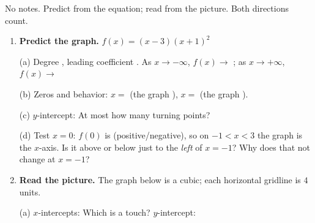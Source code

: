 \documentclass[10pt]{article}
\newcommand{\lgrid}[4]{%
  \draw[step=1, linegray!40, very thin] (#1,#3) grid (#2,#4);
  \draw[->, semithick, charcoal] (#1,0)--(#2,0) node[below right, font=\scriptsize]{$x$};
  \draw[->, semithick, charcoal] (0,#3)--(0,#4) node[left, font=\scriptsize]{$y$};}
\begin{document}
\namedateperiod

\vspace{0.08in}

No notes. Predict from the equation; read from the picture. Both directions count.

\begin{enumerate}[leftmargin=1.8em, itemsep=10pt]
  \item \textbf{Predict the graph.} $f(x) = (x-3)(x+1)^2$

    \vspace{3pt}
    (a) Degree \blank{0.8cm}, leading coefficient \blank{0.8cm}. \; As $x \to -\infty$, $f(x) \to$
    \blank{1.2cm}; as $x \to +\infty$, $f(x) \to$ \blank{1.2cm}

    \vspace{3pt}
    (b) Zeros and behavior: $x = $ \blank{1.0cm} (the graph \blank{1.8cm}), \quad
    $x = $ \blank{1.0cm} (the graph \blank{1.8cm}).

    \vspace{3pt}
    (c) $y$-intercept: \blank{1.6cm} \qquad At most how many turning points? \blank{1.0cm}

    \vspace{3pt}
    (d) Test $x=0$: $f(0)$ is \blank{1.6cm} (positive/negative), so on $-1<x<3$ the graph is
    \blank{1.6cm} the $x$-axis. Is it above or below just to the \emph{left} of $x=-1$?
    \blank{1.6cm} \; Why does that not change at $x=-1$? \blank{4.4cm}

  \item \textbf{Read the picture.} The graph below is a cubic; each horizontal gridline is $4$ units.
    \begin{center}
    \end{center}

    \vspace{2pt}
    (a) $x$-intercepts: \blank{2.4cm} \; Which is a touch? \blank{1.2cm} \;
    $y$-intercept: \blank{1.4cm}


\end{enumerate}
\end{document}
